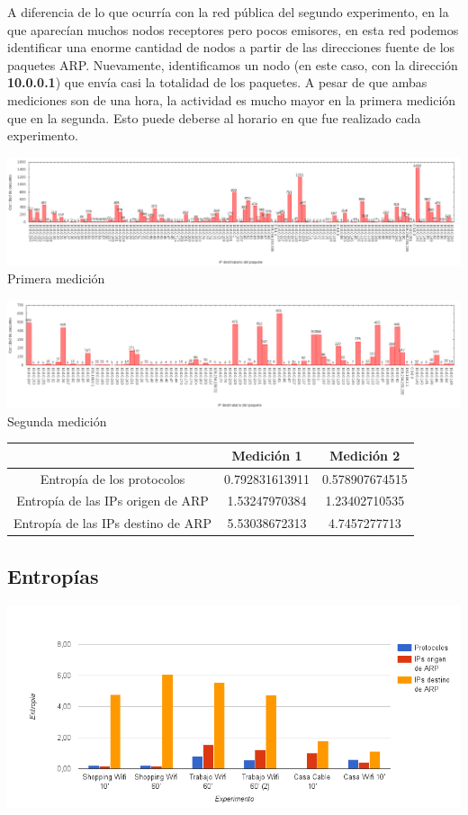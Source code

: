 A diferencia de lo que ocurría con la red pública del segundo experimento, en la que aparecían muchos nodos receptores pero pocos emisores,
en esta red podemos identificar una enorme cantidad de nodos a partir de las direcciones fuente de los paquetes ARP.
Nuevamente, identificamos un nodo (en este caso, con la dirección \textbf{10.0.0.1}) que envía casi la totalidad de los paquetes.
A pesar de que ambas mediciones son de una hora, la actividad es mucho mayor en la primera medición que en la segunda. Esto puede
deberse al horario en que fue realizado cada experimento.

\begin{center}
\includegraphics[width=16cm]{../mediciones/job1/dst.png}
Primera medición
\end{center}

\begin{center}
\includegraphics[width=16cm]{../mediciones/job2/dst.png}
Segunda medición
\end{center}

\begin{center}
\begin{tabular}{|c||c|c|}
\hline
 & Medición 1 & Medición 2 \\
\hline
\hline
Entropía de los protocolos & 0.792831613911 & 0.578907674515 \\
\hline
Entropía de las IPs origen de ARP & 1.53247970384 & 1.23402710535 \\
\hline
Entropía de las IPs destino de ARP & 5.53038672313 & 4.7457277713 \\
\hline
\end{tabular}
\end{center}

\subsection{Entropías}

\begin{center}
\includegraphics[width=14cm]{../mediciones/entropias.png}
\end{center}
